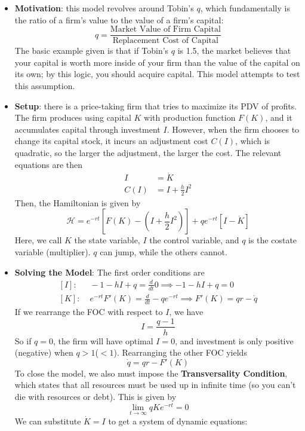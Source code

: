 \documentclass[12pt]{article}
\begin{document}
\begin{itemize}
    \item \textbf{Motivation}: this model revolves around Tobin's $q$, which fundamentally is the ratio of a firm's value to the value of a firm's capital:
    \[q = \frac{\text{Market Value of Firm Capital}}{\text{Replacement Cost of Capital}}\]
    The basic example given is that if Tobin's $q$ is 1.5, the market believes that your capital is worth more inside of your firm than the value of the capital on its own; by this logic, you should acquire capital. This model attempts to test this assumption.
    \item \textbf{Setup}: there is a price-taking firm that tries to maximize its PDV of profits. The firm produces using capital $K$ with production function $F(K)$, and it accumulates capital through investment $I$. However, when the firm chooses to change its capital stock, it incurs an adjustment cost $C(I)$, which is quadratic, so the larger the adjustment, the larger the cost. The relevant equations are then
    \[\begin{split}
        I &= \dot{K} \\
        C(I) &= I + \frac{h}{2}I^2
    \end{split}\]
    Then, the Hamiltonian is given by
    \[\mathcal{H} = e^{-rt}\left[F(K) - \left(I + \frac{h}{2}I^2\right)\right] + qe^{-rt}\left[I - \dot{K}\right]\]
    Here, we call $K$ the state variable, $I$ the control variable, and $q$ is the costate variable (multiplier). $q$ can jump, while the others cannot. 
    \item \textbf{Solving the Model}: The first order conditions are
    \[\begin{split}
        [I]:&\; -1 -hI + q = \frac{d}{dt}0 \implies -1 -hI + q = 0 \\
        [K]:&\; e^{-rt}F'(K) = \frac{d}{dt}-qe^{-rt} \implies F'(K) = qr - \dot{q}
    \end{split}\]
    If we rearrange the FOC with respect to $I$, we have
    \[I = \frac{q-1}{h}\]
    So if $q=0$, the firm will have optimal $I = 0$, and investment is only positive (negative) when $q>1$($<1$). Rearranging the other FOC yields
    \[\dot{q} = qr - F'(K)\]
    To close the model, we also must impose the \textbf{Transversality Condition}, which states that all resources must be used up in infinite time (so you can't die with resources or debt). This is given by
    \[\lim_{t\to\infty}qKe^{-rt} = 0\]
    We can substitute $\dot{K} = I$ to get a system of dynamic equations:
    \[\begin{split}

\end{split}\]
\end{itemize}
\end{document}
